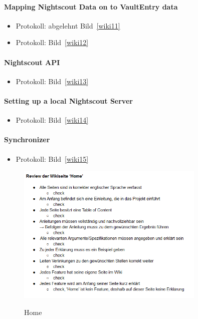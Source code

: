 \documentclass[accentcolor=tud0b,12pt,paper=a4]{tudreport}
\begin{document}
\paragraph{Mapping Nightscout Data on to VaultEntry data}
\begin{itemize}
\item Protokoll: abgelehnt Bild~\ref{wiki11}
\item Protokoll: Bild~\ref{wiki12}
\end{itemize}

\paragraph{Nightscout API}
\begin{itemize}
\item Protokoll: Bild~\ref{wiki13}
\end{itemize}

\paragraph{Setting up a local Nightscout Server}
\begin{itemize}
\item Protokoll: Bild~\ref{wiki14}
\end{itemize}

\paragraph{Synchronizer}
\begin{itemize}
\item Protokoll: Bild~\ref{wiki15}
\end{itemize}



\begin{figure}[h]
\centering
\caption{Home}
\includegraphics[width=0.8\textwidth]{wiki1}
\label{wiki1}
\end{figure}
\end{document}
